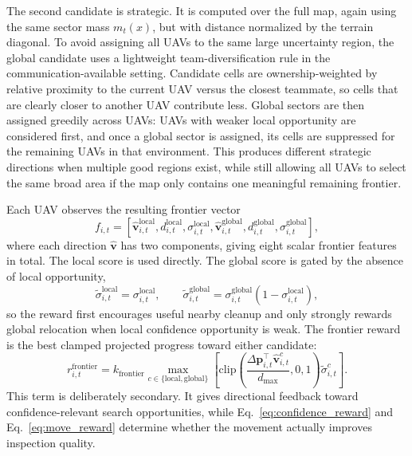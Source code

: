 \documentclass{article}
\newcommand{\move}{\Delta \mathbf{p}}
\newcommand{\vect}{\mathbf{v}}
\begin{document}
The second candidate is strategic. It is computed over the full map, again using
the same sector mass \(m_t(x)\), but with distance normalized by the terrain
diagonal. To avoid assigning all UAVs to the same large uncertainty region, the
global candidate uses a lightweight team-diversification rule in the
communication-available setting. Candidate cells are ownership-weighted by
relative proximity to the current UAV versus the closest teammate, so cells that
are clearly closer to another UAV contribute less. Global sectors are then
assigned greedily across UAVs: UAVs with weaker local opportunity are considered
first, and once a global sector is assigned, its cells are suppressed for the
remaining UAVs in that environment. This produces different strategic directions
when multiple good regions exist, while still allowing all UAVs to select the
same broad area if the map only contains one meaningful remaining frontier.

Each UAV observes the resulting frontier vector
\begin{equation}
    f_{i,t}
    =
    [
    \hat{\vect}^{\mathrm{local}}_{i,t},
    d^{\mathrm{local}}_{i,t},
    \sigma^{\mathrm{local}}_{i,t},
    \hat{\vect}^{\mathrm{global}}_{i,t},
    d^{\mathrm{global}}_{i,t},
    \sigma^{\mathrm{global}}_{i,t}
    ],
    \label{eq:local_global_frontier_obs}
\end{equation}
where each direction \(\hat{\vect}\) has two components, giving eight scalar
frontier features in total. The local score is used directly. The global score is
gated by the absence of local opportunity,
\begin{equation}
    \tilde{\sigma}^{\mathrm{local}}_{i,t}
    =
    \sigma^{\mathrm{local}}_{i,t},
    \qquad
    \tilde{\sigma}^{\mathrm{global}}_{i,t}
    =
    \sigma^{\mathrm{global}}_{i,t}
    \left(1-\sigma^{\mathrm{local}}_{i,t}\right),
    \label{eq:local_global_frontier_gate}
\end{equation}
so the reward first encourages useful nearby cleanup and only strongly rewards
global relocation when local confidence opportunity is weak. The frontier reward
is the best clamped projected progress toward either candidate:
\begin{equation}
    r^{\mathrm{frontier}}_{i,t}
    =
    k_{\mathrm{frontier}}
    \max_{c \in \{\mathrm{local},\mathrm{global}\}}
    \left[
        \mathrm{clip}
        \left(
            \frac{\move_{i,t}^{\top}\hat{\vect}^{c}_{i,t}}{d_{\max}},
            0,
            1
        \right)
        \tilde{\sigma}^{c}_{i,t}
    \right].
    \label{eq:frontier_reward}
\end{equation}
This term is deliberately secondary. It gives directional feedback toward
confidence-relevant search opportunities, while Eq.~\ref{eq:confidence_reward}
and Eq.~\ref{eq:move_reward} determine whether the movement actually improves
inspection quality.
\end{document}
